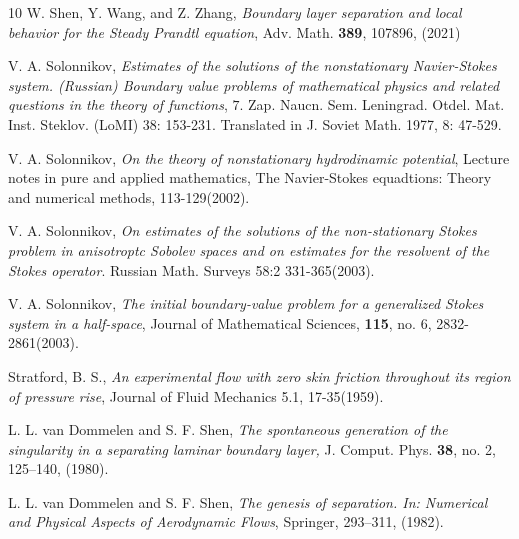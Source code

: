 \documentclass{amsart}
\numberwithin{equation}{section}
\begin{document}
\begin{thebibliography}{10}
 W. Shen, Y. Wang, and Z. Zhang, {\it Boundary layer separation and local behavior for the Steady Prandtl equation}, Adv. Math. {\bf 389}, 107896, (2021)

  V. A. Solonnikov, {\it Estimates of the solutions of the nonstationary Navier-Stokes system.
(Russian) Boundary value problems of mathematical physics and related questions in the theory of functions},
$7$. Zap. Naucn. Sem. Leningrad. Otdel. Mat. Inst. Steklov. (LoMI) 38: 153-231. Translated in J. Soviet Math. 1977, 8: 47-529.



 V. A. Solonnikov, {\it On the theory of nonstationary hydrodinamic potential},
Lecture notes in pure and applied mathematics, The Navier-Stokes equadtions: Theory and numerical methods, 113-129(2002).

 V. A. Solonnikov, {\it On estimates of the solutions of the non-stationary Stokes problem in anisotroptc Sobolev spaces and on estimates for the resolvent of the Stokes operator}. Russian Math. Surveys 58:2 331-365(2003).






 V. A. Solonnikov, {\it The initial boundary-value problem for a generalized Stokes system in a half-space}, Journal of Mathematical Sciences, {\bf 115}, no. 6, 2832-2861(2003).

  Stratford, B. S., {\it An experimental flow with zero skin friction throughout its region of pressure rise}, Journal of Fluid Mechanics 5.1,   17-35(1959).
 


 L. L. van Dommelen and  S. F. Shen, {\it The spontaneous generation of the singularity in a separating laminar boundary layer,} J. Comput. Phys. {\bf 38}, no. 2, 125–140, (1980).

  L. L. van Dommelen and  S. F. Shen, {\it The genesis of separation. In: Numerical and Physical Aspects of Aerodynamic Flows}, Springer, 293–311, (1982).






\end{thebibliography}
\end{document}
